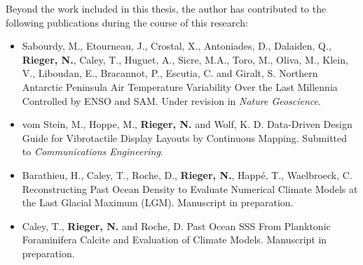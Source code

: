 Beyond the work included in this thesis, the author has contributed to the following publications during the course of this research:

\begin{itemize}
    \item Sabourdy, M., Etourneau, J., Crostal, X., Antoniades, D., Dalaiden, Q., \textbf{Rieger, N.}, Caley, T., Huguet, A., Sicre, M.A., Toro, M., Oliva, M., Klein, V., Liboudan, E., Bracannot, P., Escutia, C. and Giralt, S. Northern Antarctic Peninsula Air Temperature Variability Over the Last Millennia Controlled by ENSO and SAM. Under revision in \emph{Nature Geoscience}.
    \item vom Stein, M., Hoppe, M., \textbf{Rieger, N.} and Wolf, K. D. Data-Driven Design Guide for Vibrotactile Display Layouts by Continuous Mapping. Submitted to \emph{Communications Engineering}.
    \item Barathieu, H., Caley, T., Roche, D., \textbf{Rieger, N.}, Happé, T., Waelbroeck, C. Reconstructing Past Ocean Density to Evaluate Numerical Climate Models at the Last Glacial Maximum (LGM). Manuscript in preparation.
    \item Caley, T., \textbf{Rieger, N.} and Roche, D. Past Ocean SSS From Planktonic Foraminifera Calcite and Evaluation of Climate Models. Manuscript in preparation.
\end{itemize}

\clearpage
